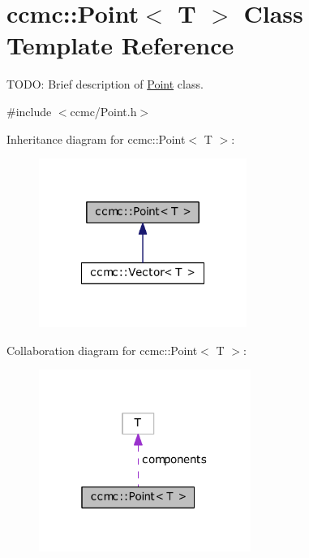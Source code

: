\hypertarget{classccmc_1_1_point}{\section{ccmc\-:\-:Point$<$ T $>$ Class Template Reference}
\label{classccmc_1_1_point}
}


T\-O\-D\-O\-: Brief description of \hyperlink{classccmc_1_1_point}{Point} class.  




{\ttfamily \#include $<$ccmc/\-Point.\-h$>$}



Inheritance diagram for ccmc\-:\-:Point$<$ T $>$\-:
\nopagebreak
\begin{figure}[H]
\begin{center}
\leavevmode
\includegraphics[width=192pt]{classccmc_1_1_point__inherit__graph}
\end{center}
\end{figure}


Collaboration diagram for ccmc\-:\-:Point$<$ T $>$\-:
\nopagebreak
\begin{figure}[H]
\begin{center}
\leavevmode
\includegraphics[width=196pt]{classccmc_1_1_point__coll__graph}
\end{center}
\end{figure}

